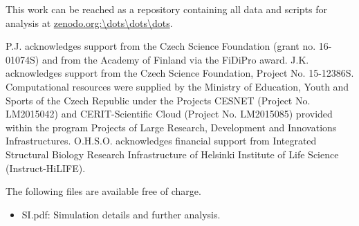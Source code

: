 \documentclass[journal=jpcbfk,manuscript=article]{achemso}
\begin{document}
This work can be reached as a repository containing all data and scripts for analysis at \url{zenodo.org:\dots\dots\dots}.


\begin{acknowledgement}
P.J. acknowledges support from the Czech Science Foundation (grant no. 16-01074S) 
and from the Academy of Finland via the FiDiPro award.
J.K. acknowledges support from the Czech Science Foundation, Project No. 15-12386S.
Computational resources were supplied by the Ministry of Education, Youth and Sports
of the Czech Republic under the Projects CESNET (Project No. LM2015042) and CERIT-Scientific
Cloud (Project No. LM2015085) provided within the program Projects of Large Research,
Development and Innovations Infrastructures.
O.H.S.O. acknowledges financial support from
Integrated Structural Biology Research Infrastructure of
Helsinki Institute of Life Science (Instruct-HiLIFE).
\end{acknowledgement}

\begin{suppinfo}


The following files are available free of charge.
\begin{itemize}
  \item SI.pdf: Simulation details and further analysis.
\end{itemize}

\end{suppinfo}




\listoftodos
\end{document}
